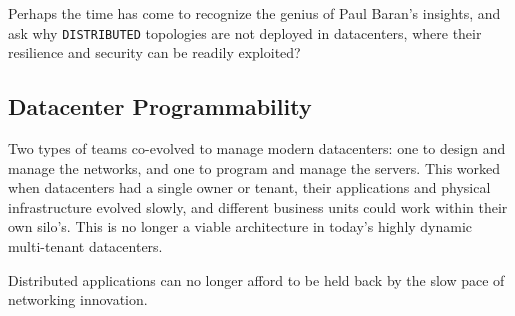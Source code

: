 \documentclass[../../../OAE-SPEC-MAIN.tex]{subfiles}
\begin{document}

\begin{highlightbox}
\noindent Perhaps the time has come to recognize the genius of Paul Baran's insights, and ask why \texttt{DISTRIBUTED} topologies are not deployed in datacenters, where their resilience and security can be readily exploited?
\end{highlightbox}

\subsection*{Datacenter Programmability}

Two types of teams co-evolved to manage modern datacenters: one to design and manage the networks, and one to program and manage the servers. This worked %
when datacenters had a single owner or tenant, their applications and physical infrastructure evolved slowly, and different business units could work within their own silo's. %
This is no longer a viable architecture in today's highly dynamic multi-tenant datacenters.

\begin{highlightbox}
\noindent Distributed applications can no longer afford to be held back by the slow pace of networking innovation.
\end{highlightbox}
\end{document}
